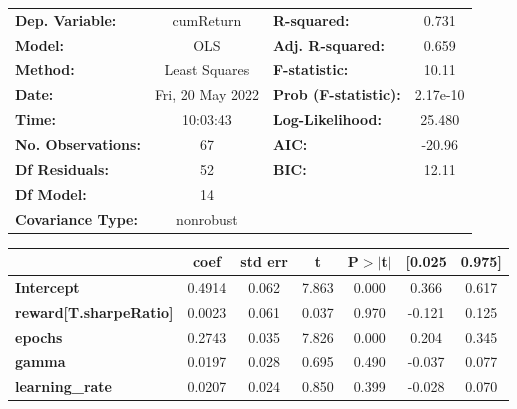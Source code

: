 \begin{center}
\begin{tabular}{lclc}
\toprule
\textbf{Dep. Variable:}              &    cumReturn     & \textbf{  R-squared:         } &     0.731   \\
\textbf{Model:}                      &       OLS        & \textbf{  Adj. R-squared:    } &     0.659   \\
\textbf{Method:}                     &  Least Squares   & \textbf{  F-statistic:       } &     10.11   \\
\textbf{Date:}                       & Fri, 20 May 2022 & \textbf{  Prob (F-statistic):} &  2.17e-10   \\
\textbf{Time:}                       &     10:03:43     & \textbf{  Log-Likelihood:    } &    25.480   \\
\textbf{No. Observations:}           &          67      & \textbf{  AIC:               } &    -20.96   \\
\textbf{Df Residuals:}               &          52      & \textbf{  BIC:               } &     12.11   \\
\textbf{Df Model:}                   &          14      & \textbf{                     } &             \\
\textbf{Covariance Type:}            &    nonrobust     & \textbf{                     } &             \\
\bottomrule
\end{tabular}
\begin{tabular}{lcccccc}
                                     & \textbf{coef} & \textbf{std err} & \textbf{t} & \textbf{P$> |$t$|$} & \textbf{[0.025} & \textbf{0.975]}  \\
\midrule
\textbf{Intercept}                   &       0.4914  &        0.062     &     7.863  &         0.000        &        0.366    &        0.617     \\
\textbf{reward[T.sharpeRatio]}       &       0.0023  &        0.061     &     0.037  &         0.970        &       -0.121    &        0.125     \\
\textbf{epochs}                      &       0.2743  &        0.035     &     7.826  &         0.000        &        0.204    &        0.345     \\
\textbf{gamma}                       &       0.0197  &        0.028     &     0.695  &         0.490        &       -0.037    &        0.077     \\
\textbf{learning\_rate}              &       0.0207  &        0.024     &     0.850  &         0.399        &       -0.028    &        0.070     \\

\end{tabular}
\end{center}
